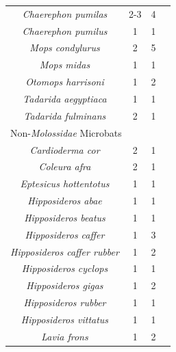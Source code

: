 \documentclass[9pt,twoside,lineno]{pnas-new}
\begin{document}
\begin{longtable}{cccp{5cm}}
\hline \hline
\textit{Chaerephon pumilas} & 2-3 & 4 & \cite{vanderMerwe1987AdaptiveS,Happold1989ReproductionAfrica.,MUTERE1973ReproductionMolossidae,Mcwilliam1987TheEnvironment}\\
\textit{Chaerephon pumilus} & 1 & 1 & \cite{Monadjem1998NotesRecords}\\
\textit{Mops condylurus} & 2 & 5 & \cite{Vivier2001AspectsAfrica,Happold1989ReproductionAfrica.,OShea1980EcologicalCommunity,MUTERE1973ReproductionMolossidae}\\
\textit{Mops midas} & 1 & 1 & \cite{Smithers1971TheBotswana}\\
\textit{Otomops harrisoni} & 1 & 2 & \cite{MUTERE1973ReproductionMolossidae}\\
\textit{Tadarida aegyptiaca} & 1 & 1 & \cite{Bernard1995SeasonallyTemperate...}\\
\textit{Tadarida fulminans} & 2 & 1 & \cite{Cotterill1993SeasonallyZimbabwe}\\
\hline
\multicolumn{4}{l}{Non-\textit{Molossidae} Microbats} \\
\hline \hline
\textit{Cardioderma cor} & 2 & 1 & \cite{Vaughan1976NocturnalCor}\\
\textit{Coleura afra} & 2 & 1 & \cite{Mcwilliam1987TheEnvironment}\\
\textit{Eptesicus hottentotus} & 1 & 1 & \cite{Happold2013MammalsBats}\\
\textit{Hipposideros abae} & 1 & 1 & \cite{Verschuren1957EcologieChiropteres}\\
\textit{Hipposideros beatus} & 1 & 1 & \cite{Brosset1966LaChiropteres}\\
\textit{Hipposideros caffer} & 1 & 3 & \cite{Bernard1982FemaleAfrica,Ansell1986SomeAfrica,Menzies1973ANigeria}\\
\textit{Hipposideros caffer rubber} & 1 & 2 & \cite{Verschuren1957EcologieChiropteres,Wolton1982EcologicalMicrochiroptera}\\
\textit{Hipposideros cyclops
} & 1 & 1 & \cite{Verschuren1957EcologieChiropteres}\\
\textit{Hipposideros gigas} & 1 & 2 & \cite{Mcwilliam1982AdaptiveKenya,Brosset1969LaGabon}\\
\textit{Hipposideros rubber} & 1 & 1 & \cite{Howell1976AnTanzania}\\
\textit{Hipposideros vittatus} & 1 & 1 & \cite{Cotterill1999ReproductiveConservation}\\
\textit{Lavia frons} & 1 & 2 & \cite{Verschuren1957EcologieChiropteres,Vaughan1986SeasonalityYellow-Winged}\\

\end{longtable}
\end{document}
